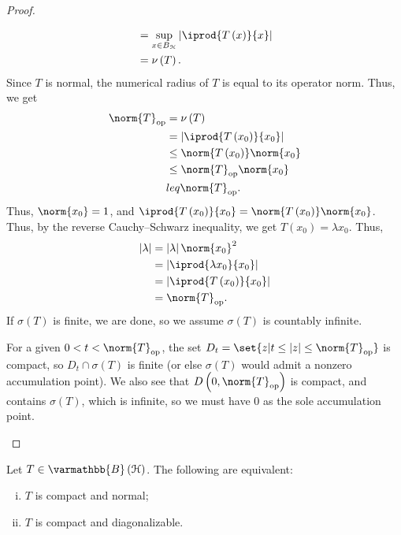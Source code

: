 \documentclass[10pt]{mypackage}
\renewcommand*{\mathbb}[1]{\varmathbb{#1}}
\newcommand{\B}{\mathbb{B}}
\begin{document}
\begin{proof}
\begin{enumerate}[(1)]
\begin{align*}
                                                              &= \sup_{x\in B_{\mathcal{H}}} \left\vert \iprod{T\left(x\right)}{x} \right\vert\\
                                                              &= \nu\left(T\right).
      \end{align*}
      Since $T$ is normal, the numerical radius of $T$ is equal to its operator norm. Thus, we get
      \begin{align*}
        \norm{T}_{\text{op}} &= \nu\left(T\right)\\
                             &= \left\vert \iprod{T\left(x_0\right)}{x_0} \right\vert\\
                             &\leq \norm{T\left(x_0\right)}\norm{x_0}\\
                             &\leq \norm{T}_{\text{op}}\norm{x_0}\\
                             &leq \norm{T}_{\text{op}}.
      \end{align*}
      Thus, $\norm{x_0} = 1$, and $ \iprod{T\left(x_0\right)}{x_0} = \norm{T\left(x_0\right)}\norm{x_0} $. Thus, by the reverse Cauchy--Schwarz inequality, we get $T\left(x_0\right) = \lambda x_0$. Thus,
      \begin{align*}
        \left\vert \lambda \right\vert &= \left\vert \lambda \right\vert\norm{x_0}^2\\
                                       &= \left\vert \iprod{\lambda x_0}{x_0} \right\vert\\
                                       &= \left\vert \iprod{T\left(x_0\right)}{x_0} \right\vert\\
                                       &= \norm{T}_{\text{op}}.
      \end{align*}
      If $\sigma\left(T\right)$ is finite, we are done, so we assume $\sigma\left(T\right)$ is countably infinite.\newline

      For a given $0 < t < \norm{T}_{\text{op}}$, the set $D_t = \set{z | t \leq \left\vert z \right\vert \leq \norm{T}_{\text{op}}}$ is compact, so $D_t\cap \sigma\left(T\right)$ is finite (or else $\sigma\left(T\right)$ would admit a nonzero accumulation point). We also see that $D\left(0,\norm{T}_{\text{op}}\right)$ is compact, and contains $\sigma\left(T\right)$, which is infinite, so we must have $0$ as the sole accumulation point.
  \end{enumerate}
\end{proof}
\begin{theorem}
  Let $T\in \B\left(\mathcal{H}\right)$. The following are equivalent:
  \begin{enumerate}[(i)]
    \item $T$ is compact and normal;
    \item $T$ is compact and diagonalizable.
  \end{enumerate}
\end{theorem}
\end{document}
